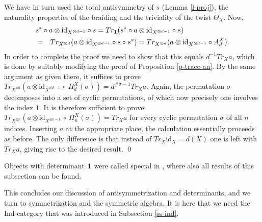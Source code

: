 \documentclass[11pt]{article}
\theoremstyle{definition}
\theoremstyle{definition}
\theoremstyle{remark}
\def\1#1{{\bf #1}}
\def\ol#1{{\overline #1}}
\newcommand{\mcirc}{\,\circ\,}
\newcommand{\rarr}{\rightarrow}
\def\id{\mathrm{id}}
\begin{document}
We have in turn used the total antisymmetry of $s$ (Lemma \ref{l-proj}), the naturality properties 
of the braiding and the triviality of the twist $\Theta_X$. Now, 
\begin{eqnarray*} \lefteqn{ s^*\circ a\otimes\id_{X^{\otimes d-1}}\circ s
  = Tr_\11(s^*\circ a\otimes\id_{X^{\otimes d-1}}\circ
  s) } && \\
  &=& Tr_{X^{\otimes d}}(a\otimes\id_{X^{\otimes
      d-1}}\circ s\circ s^*)   
  = Tr_{X^{\otimes d}}(a\otimes\id_{X^{\otimes d-1}}\circ A^X_d).
\end{eqnarray*}
In order to complete the proof we need to show that this equals $d^{-1}Tr_Xa$, which is done by
suitably modifying the proof of Proposition \ref{p-trace-an}. By the same argument as given there,
it suffices to prove 
$Tr_{X^{\otimes d}}(a\otimes\id_{X^{\otimes d-1}}\mcirc \Pi^X_d(\sigma))=d^{\#\sigma -1}Tr_Xa$.
Again, the permutation $\sigma$ decomposes into a set of cyclic permutations, of which now precisely
one involves the index $1$. It is therefore sufficient to prove
$Tr_{X^{\otimes n}}(a\otimes\id_{X^{\otimes n-1}}\mcirc \Pi^X_n(\sigma))=Tr_Xa$ for every cyclic
permutation $\sigma$ of all $n$ indices. Inserting $a$ at the appropriate place, the calculation
essentially proceeds as before. The only difference is that instead of $Tr_X\id_X=d(X)$ one is left
with $Tr_Xa$, giving rise to the desired result.
\qed

\brem Objects with determinant $\11$ were called special in \cite{DR}, where also all results of
this subsection can be found. 
\erem



This concludes our discussion of antisymmetrization  and determinants, and we turn to
symmetrization and the symmetric algebra. It is here that we need the Ind-category that was
introduced in Subsection \ref{ss-ind}.
\end{document}
